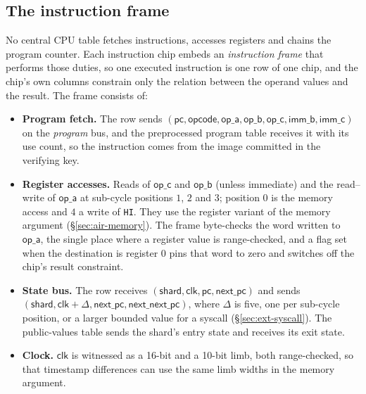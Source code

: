 \subsection{The instruction frame}
\label{sec:air-frame}

No central CPU table fetches instructions, accesses registers and chains the program counter. Each instruction chip embeds an \emph{instruction frame} that performs those duties, so one executed instruction is one row of one chip, and the chip's own columns constrain only the relation between the operand values and the result. The frame consists of:

\begin{itemize}
  \item \textbf{Program fetch.} The row sends $(\mathsf{pc}, \mathsf{opcode}, \mathsf{op\_a}, \mathsf{op\_b}, \mathsf{op\_c}, \mathsf{imm\_b}, \mathsf{imm\_c})$ on the \emph{program} bus, and the preprocessed program table receives it with its use count, so the instruction comes from the image committed in the verifying key.
  \item \textbf{Register accesses.} Reads of $\mathsf{op\_c}$ and $\mathsf{op\_b}$ (unless immediate) and the read--write of $\mathsf{op\_a}$ at sub-cycle positions $1$, $2$ and $3$; position $0$ is the memory access and $4$ a write of \texttt{HI}. They use the register variant of the memory argument (\S\ref{sec:air-memory}). The frame byte-checks the word written to $\mathsf{op\_a}$, the single place where a register value is range-checked, and a flag set when the destination is register 0 pins that word to zero and switches off the chip's result constraint.
  \item \textbf{State bus.} The row receives $(\mathsf{shard}, \mathsf{clk}, \mathsf{pc}, \mathsf{next\_pc})$ and sends $(\mathsf{shard}, \mathsf{clk}+\Delta, \mathsf{next\_pc}, \mathsf{next\_next\_pc})$, where $\Delta$ is five, one per sub-cycle position, or a larger bounded value for a syscall (\S\ref{sec:ext-syscall}). The public-values table sends the shard's entry state and receives its exit state.
  \item \textbf{Clock.} $\mathsf{clk}$ is witnessed as a 16-bit and a 10-bit limb, both range-checked, so that timestamp differences can use the same limb widths in the memory argument.
\end{itemize}

